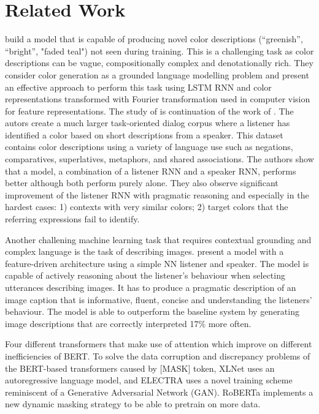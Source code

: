 \section{Related Work}

\citep{monroe-2016-compositional} build a model that is capable of producing novel color descriptions (“greenish”, “bright”, "faded teal") not seen during training. This is a challenging task as color descriptions can be vague, compositionally complex and denotationally rich. They consider color generation as a grounded language modelling problem and present an effective approach to perform this task using LSTM RNN and color representations transformed with Fourier transformation used in computer vision for feature representations. The study of \citep{monroe-2017-colors} is continuation of the work of \citep{monroe-2016-compositional}. The autors create a much larger task-oriented dialog corpus \citep{moroe-2017-colors-reference-dataset} where a listener has identified a color based on short descriptions from a speaker. This dataset contains color descriptions using a variety of language use such as negations, comparatives, superlatives, metaphors, and shared associations. The authors show that a model, a combination of a listener RNN and a speaker RNN, performs better although both perform purely alone. They also observe significant improvement of the listener RNN with pragmatic reasoning and especially in the hardest cases: 1) contexts with very similar colors; 2) target colors that the referring expressions fail to identify.

\par
Another challening machine learning task that requires contextual grounding and complex language is the task of describing images. \citep{andreas-2016-reasoning} present a model with a feature-driven architecture using a simple NN listener and speaker. The model is capable of actively reasoning about the listener’s behaviour when selecting utterances describing images. It has to produce a pragmatic description of an image caption that is informative, fluent, concise and understanding the listeners’ behaviour. The model is able to outperform the baseline system by generating image descriptions that are correctly interpreted 17\% more often.

\par
Four different transformers that make use of attention which improve on different inefficiencies of BERT. To solve the data corruption and discrepancy problems of the BERT-based transformers caused by [MASK] token, XLNet uses an autoregressive language model, and ELECTRA uses a novel training scheme reminiscent of a Generative Adversarial Network (GAN). RoBERTa implements a new dynamic masking strategy to be able to pretrain on more data.

